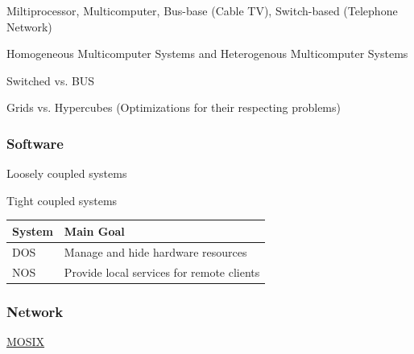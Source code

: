 \documentclass[a4paper]{article}
\begin{document}
Miltiprocessor, Multicomputer, Bus-base (Cable TV), Switch-based (Telephone Network)

Homogeneous Multicomputer Systems and Heterogenous Multicomputer Systems

Switched vs. BUS

Grids vs. Hypercubes (Optimizations for their respecting problems)

\subsubsection{Software}

Loosely coupled systems

Tight coupled systems


\begin{tabular}{ll}
    System & Main Goal\\
    \hline
    DOS & Manage and hide hardware resources\\
    NOS & Provide local services for remote clients
\end{tabular}

\subsubsection{Network}

\href{http://en.wikipedia.org/wiki/MOSIX}{MOSIX}



\end{document}
